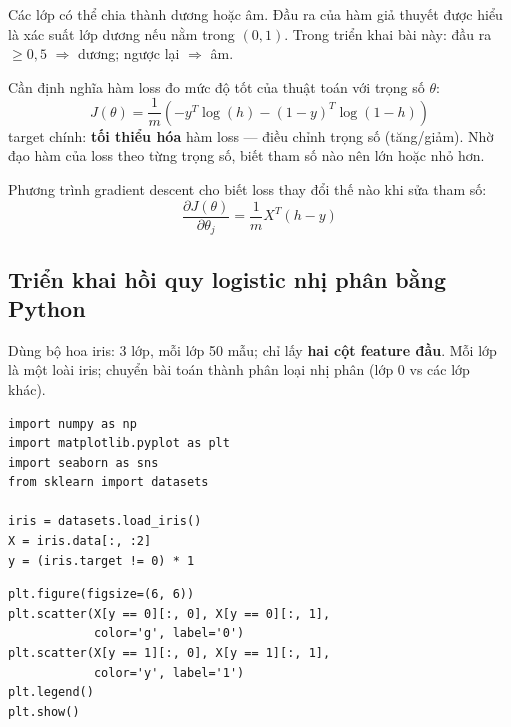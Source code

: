 \begin{phuongphap}[title={Phân lớp dương/âm}]
Các lớp có thể chia thành dương hoặc âm.
Đầu ra của hàm giả thuyết được hiểu là xác suất lớp dương nếu nằm trong $(0, 1)$.
Trong triển khai bài này: đầu ra $\geq 0{,}5$ $\Rightarrow$ dương; ngược lại $\Rightarrow$ âm.
\end{phuongphap}

\begin{dinhnghia}[title={Hàm mất mát $J(\theta)$}]
Cần định nghĩa hàm loss đo mức độ tốt của thuật toán với trọng số $\theta$:
\[
J(\theta) = \frac{1}{m}\left(-y^{T}\log(h) - (1 - y)^{T}\log(1 - h)\right)
\]
target chính: \textbf{tối thiểu hóa} hàm loss --- điều chỉnh trọng số (tăng/giảm).
Nhờ đạo hàm của loss theo từng trọng số, biết tham số nào nên lớn hoặc nhỏ hơn.
\end{dinhnghia}

\begin{dinhnghia}[title={Gradient descent}]
Phương trình gradient descent cho biết loss thay đổi thế nào khi sửa tham số:
\[
\frac{\partial J(\theta)}{\partial \theta_{j}} = \frac{1}{m} X^{T}(h - y)
\]
\end{dinhnghia}

\subsection{Triển khai hồi quy logistic nhị phân bằng Python}

\begin{dongco}[title={Dataset Iris (hai feature đầu)}]
Dùng bộ hoa iris: 3 lớp, mỗi lớp 50 mẫu; chỉ lấy \textbf{hai cột feature đầu}.
Mỗi lớp là một loài iris; chuyển bài toán thành phân loại nhị phân (lớp 0 vs các lớp khác).
\end{dongco}

\begin{vidu}[title={Import và nạp dữ liệu}]
\begin{lstlisting}
import numpy as np
import matplotlib.pyplot as plt
import seaborn as sns
from sklearn import datasets

iris = datasets.load_iris()
X = iris.data[:, :2]
y = (iris.target != 0) * 1
\end{lstlisting}
\end{vidu}

\begin{vidu}[title={Vẽ dữ liệu huấn luyện}]
\begin{lstlisting}
plt.figure(figsize=(6, 6))
plt.scatter(X[y == 0][:, 0], X[y == 0][:, 1],
            color='g', label='0')
plt.scatter(X[y == 1][:, 0], X[y == 1][:, 1],
            color='y', label='1')
plt.legend()
plt.show()
\end{lstlisting}
\end{vidu}


